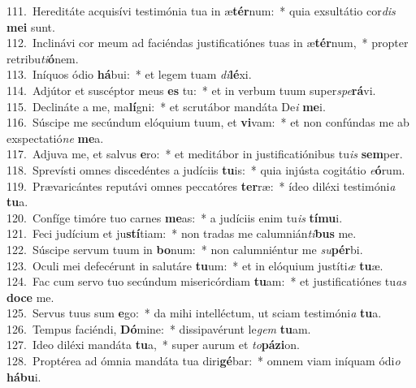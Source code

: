 {111.~}Hereditáte acquisívi testimónia tua in æ\textbf{tér}num:~* quia exsultátio cor\textit{dis} \textbf{me}\textbf{i} sunt.\\
{112.~}Inclinávi cor meum ad faciéndas justificatiónes tuas in æ\textbf{tér}num,~* propter retribu\textit{ti}\textbf{ó}nem.\\
{113.~}Iníquos ódio \textbf{há}bui:~* et legem tuam \textit{di}\textbf{lé}xi.\\
{114.~}Adjútor et suscéptor meus \textbf{es} tu:~* et in verbum tuum super\textit{spe}\textbf{rá}vi.\\
{115.~}Declináte a me, ma\textbf{lí}gni:~* et scrutábor mandáta De\textit{i} \textbf{me}i.\\
{116.~}Súscipe me secúndum elóquium tuum, et \textbf{vi}vam:~* et non confúndas me ab exspectatió\textit{ne} \textbf{me}a.\\
{117.~}Adjuva me, et salvus \textbf{e}ro:~* et meditábor in justificatiónibus tu\textit{is} \textbf{sem}per.\\
{118.~}Sprevísti omnes discedéntes a judíciis \textbf{tu}is:~* quia injústa cogitátio \textit{e}\textbf{ó}rum.\\
{119.~}Prævaricántes reputávi omnes peccatóres \textbf{ter}ræ:~* ídeo diléxi testimóni\textit{a} \textbf{tu}a.\\
{120.~}Confíge timóre tuo carnes \textbf{me}as:~* a judíciis enim tu\textit{is} \textbf{tí}\textbf{mu}i.\\
{121.~}Feci judícium et ju\textbf{stí}tiam:~* non tradas me calumnián\textit{ti}\textbf{bus} me.\\
{122.~}Súscipe servum tuum in \textbf{bo}num:~* non calumniéntur me \textit{su}\textbf{pér}bi.\\
{123.~}Oculi mei defecérunt in salutáre \textbf{tu}um:~* et in elóquium justíti\textit{æ} \textbf{tu}æ.\\
{124.~}Fac cum servo tuo secúndum misericórdiam \textbf{tu}am:~* et justificatiónes tu\textit{as} \textbf{do}\textbf{ce} me.\\
{125.~}Servus tuus sum \textbf{e}go:~* da mihi intelléctum, ut sciam testimóni\textit{a} \textbf{tu}a.\\
{126.~}Tempus faciéndi, \textbf{Dó}mine:~* dissipavérunt le\textit{gem} \textbf{tu}am.\\
{127.~}Ideo diléxi mandáta \textbf{tu}a,~* super aurum et \textit{to}\textbf{pá}\textbf{zi}on.\\
{128.~}Proptérea ad ómnia mandáta tua diri\textbf{gé}bar:~* omnem viam iníquam ódi\textit{o} \textbf{há}\textbf{bu}i.\\

